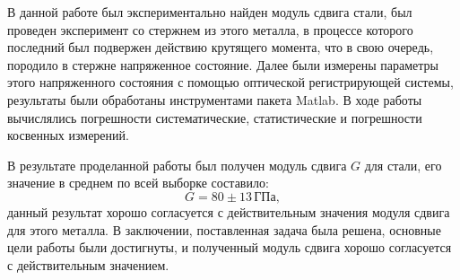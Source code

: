\documentclass[12pt, a4paper]{article}
\begin{document}
    В данной работе был экспериментально найден модуль сдвига стали, был проведен эксперимент со стержнем из этого металла, в процессе которого последний был подвержен действию крутящего момента, что в свою очередь, породило в стержне напряженное состояние. Далее были измерены параметры этого напряженного состояния с помощью оптической регистрирующей системы, результаты были обработаны инструментами пакета Matlab. В ходе работы вычислялись погрешности систематические, статистические и погрешности косвенных измерений.
    
    В результате проделанной работы был получен модуль сдвига $G$ для стали, его значение в среднем по всей выборке составило:
    \begin{equation}
        G = 80 \pm 13 \, \text{ГПа},
        \label{eq7}
    \end{equation}
    данный результат хорошо согласуется с действительным значения модуля сдвига для этого металла. В заключении, поставленная задача была решена, основные цели работы были достигнуты, и полученный модуль сдвига хорошо согласуется с действительным значением.
    
\end{document}
